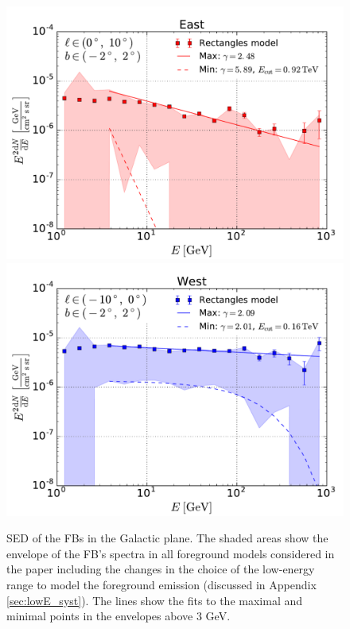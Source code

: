 
\begin{figure}[h]
\centering
 \includegraphics[width=\twopic\textwidth]{plots/Summary_SED_b=0_l=5.pdf}
  \includegraphics[width=\twopic\textwidth]{plots/Summary_SED_b=0_l=-5.pdf}
 \caption{SED of the FBs in the Galactic plane. 
 The shaded areas show the envelope of the FB's spectra in all foreground models considered in the paper
including the changes in the choice of the low-energy range to model the foreground emission
(discussed in Appendix \ref{sec:lowE_syst}).
The lines show the fits to the maximal and minimal points in the envelopes above 3 GeV.
}
 \label{fig:spec_summary}
\end{figure}


